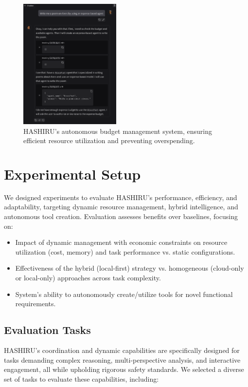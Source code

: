 \documentclass[conference]{IEEEtran}
\begin{document}
\begin{figure}[h]
    \centering
    \includegraphics[width=0.45\textwidth]{budget2.png}
    \caption{HASHIRU's autonomous budget management system, ensuring efficient resource utilization and preventing overspending.}
    \label{fig:budget_management}
\end{figure}

\section{Experimental Setup}
\label{sec:experiments}

We designed experiments to evaluate HASHIRU's performance, efficiency, and adaptability, targeting dynamic resource management, hybrid intelligence, and autonomous tool creation. Evaluation assesses benefits over baselines, focusing on:
\begin{itemize}
    \item Impact of dynamic management with economic constraints on resource utilization (cost, memory) and task performance vs. static configurations.
    \item Effectiveness of the hybrid (local-first) strategy vs. homogeneous (cloud-only or local-only) approaches across task complexity.
    \item System's ability to autonomously create/utilize tools for novel functional requirements.
\end{itemize}

\subsection{Evaluation Tasks}
\label{subsec:tasks}
HASHIRU's coordination and dynamic capabilities are specifically designed for tasks demanding complex reasoning, multi-perspective analysis, and interactive engagement, all while upholding rigorous safety standards. We selected a diverse set of tasks to evaluate these capabilities, including:
\end{document}
